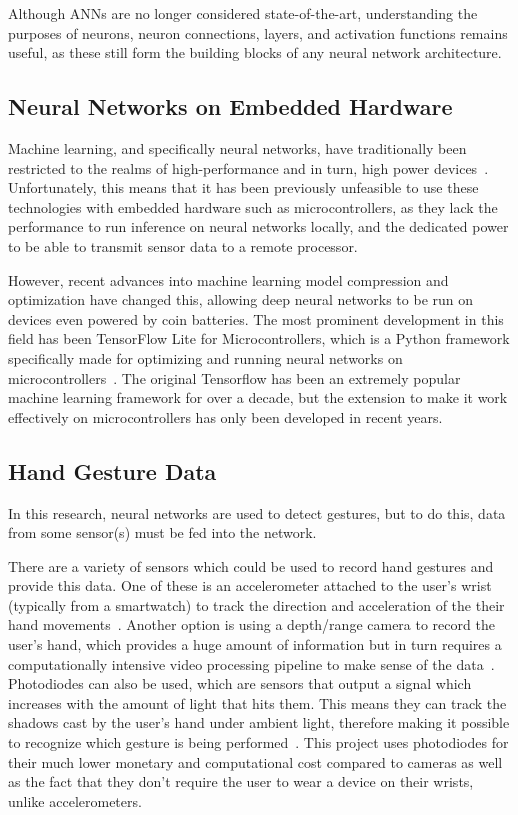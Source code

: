 Although ANNs are no longer considered state-of-the-art, understanding the purposes of neurons, neuron connections, layers, and activation functions remains useful, as these still form the building blocks of any neural network architecture.

\subsection{Neural Networks on Embedded Hardware}\label{subsec:machine-learning-on-microcontrollers}
Machine learning, and specifically neural networks, have traditionally been restricted to the realms of high-performance and in turn, high power devices~\cite{8342164}.
Unfortunately, this means that it has been previously unfeasible to use these technologies with embedded hardware such as microcontrollers, as they lack the performance to run inference on neural networks locally, and the dedicated power to be able to transmit sensor data to a remote processor.

However, recent advances into machine learning model compression and optimization have changed this, allowing deep neural networks to be run on devices even powered by coin batteries.
The most prominent development in this field has been TensorFlow Lite for Microcontrollers, which is a Python framework specifically made for optimizing and running neural networks on microcontrollers~\cite{MLSYS2021_d2ddea18}.
The original Tensorflow has been an extremely popular machine learning framework for over a decade, but the extension to make it work effectively on microcontrollers has only been developed in recent years.

\subsection{Hand Gesture Data}\label{subsec:hand-gesture-data}
In this research, neural networks are used to detect gestures, but to do this, data from some sensor(s) must be fed into the network.

There are a variety of sensors which could be used to record hand gestures and provide this data.
One of these is an accelerometer attached to the user's wrist (typically from a smartwatch) to track the direction and acceleration of the their hand movements~\cite{4912759}.
Another option is using a depth/range camera to record the user's hand, which provides a huge amount of information but in turn requires a computationally intensive video processing pipeline to make sense of the data~\cite{article}.
Photodiodes can also be used, which are sensors that output a signal which increases with the amount of light that hits them.
This means they can track the shadows cast by the user's hand under ambient light, therefore making it possible to recognize which gesture is being performed~\cite{8947919}.
This project uses photodiodes for their much lower monetary and computational cost compared to cameras as well as the fact that they don't require the user to wear a device on their wrists, unlike accelerometers.

